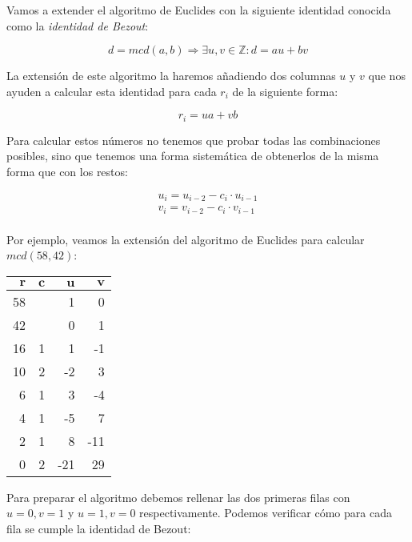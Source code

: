 Vamos a extender el algoritmo de Euclides con la siguiente identidad conocida como la \textit{identidad de Bezout}:

\[d = mcd(a,b) \Rightarrow \exists u,v \in\mathbb{Z} : d = au + bv\]

La extensión de este algoritmo la haremos añadiendo dos columnas $u$ y $v$ que nos ayuden a calcular esta identidad para cada $r_i$ de la siguiente forma:

\[r_i = ua + vb\]

Para calcular estos números no tenemos que probar todas las combinaciones posibles, sino que tenemos una forma sistemática de obtenerlos de la misma forma que con los restos:

\begin{align*}
	u_i = u_{i-2} - c_i \cdot u_{i-1} \\
	v_i = v_{i-2} - c_i \cdot v_{i-1} \\
\end{align*}

Por ejemplo, veamos la extensión del algoritmo de Euclides para calcular $mcd(58,42)$:

\begin{center}
\begin{tabular}{r r r r}
	$\boldsymbol{r}$ & $\boldsymbol{c}$ & $\boldsymbol{u}$ & $\boldsymbol{v}$ \\
	\toprule
	58               &                  & 1                & 0                \\
	42               &                  & 0                & 1                \\
	16               & 1                & 1                & -1               \\
	10               & 2                & -2               & 3                \\
	6                & 1                & 3                & -4               \\
	4                & 1                & -5               & 7                \\
	2                & 1                & 8                & -11              \\
	0                & 2                & -21              & 29               \\
\end{tabular}
\end{center}

Para preparar el algoritmo debemos rellenar las dos primeras filas con $u=0, v=1$ y $u=1, v=0$ respectivamente.
Podemos verificar cómo para cada fila se cumple la identidad de Bezout:

